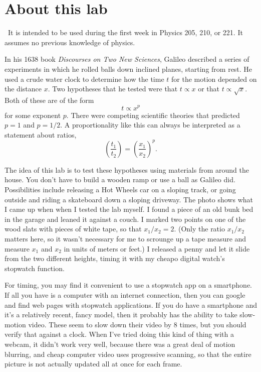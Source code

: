 \addtocounter{chapter}{-1}
\renewcommand\thechapter{c1.1a}
\label{lab:covid-measurement}

\section*{About this lab}

\covid\ 
It is intended to be used during the first week in Physics 205, 210, or 221.
It assumes no previous knowledge of physics.

\introduction

In his 1638 book \emph{Discourses on Two New Sciences}, Galileo described a series
of experiments in which he rolled balls down inclined planes, starting from rest.
He used a crude water clock to determine how the time $t$ for the motion depended
on the distance $x$. Two hypotheses that he tested were that $t \propto x$ or
that $t \propto \sqrt{x}$. Both of these are of the form
\begin{equation*}
  t \propto x^p
\end{equation*}
for some exponent $p$. There were competing scientific theories that predicted
$p=1$ and $p=1/2$. A proportionality like this can always be interpreted as a statement
about ratios,
\begin{equation*}
  \left(\frac{t_1}{t_2}\right) = \left(\frac{x_1}{x_2}\right)^p.
\end{equation*}


\observations

The idea of this lab is to test these hypotheses using materials from
around the house. You don't have to build a wooden ramp or use a ball as Galileo did.
Possibilities include releasing a Hot Wheels car on a sloping track, or going outside
and riding a skateboard down a sloping driveway. The photo shows what I came up when
when I tested the lab myself. I found a piece of an old bunk bed in the garage and
leaned it against a couch. I marked two points on one of the wood slats with pieces
of white tape, so that $x_1/x_2=2$. (Only the ratio $x_1/x_2$ matters here, so it
wasn't necessary for me to scrounge up a tape measure and measure $x_1$ and $x_2$ in
units of meters or feet.) I released a penny and let it slide from the two different
heights, timing it with my cheapo digital watch's stopwatch function.


For timing, you may find it convenient to use a stopwatch app on a smartphone. If
all you have is a computer with an internet connection, then you can google and find web pages
with stopwatch applications. If you do have a smartphone and it's a relatively recent, fancy
model, then it probably has the ability to take slow-motion video. These seem to slow down
their video by 8 times, but you should verify that against a clock. When I've tried doing
this kind of thing with a webcam, it didn't work very well, because there was a great deal
of motion blurring, and cheap computer video uses progressive scanning, so that the entire
picture is not actually updated all at once for each frame.

